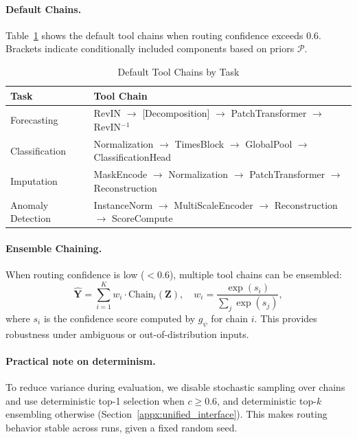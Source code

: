 \paragraph{Default Chains.}
Table~\ref{tab:default_chains} shows the default tool chains when routing confidence exceeds 0.6. Brackets indicate conditionally included components based on priors $\mathcal{P}$.

\begin{table}[h]
\centering
\caption{Default Tool Chains by Task}
\label{tab:default_chains}
\begin{tabular}{ll}
\toprule
\textbf{Task} & \textbf{Tool Chain} \\
\midrule
Forecasting & RevIN $\rightarrow$ [Decomposition] $\rightarrow$ PatchTransformer $\rightarrow$ RevIN$^{-1}$ \\
Classification & Normalization $\rightarrow$ TimesBlock $\rightarrow$ GlobalPool $\rightarrow$ ClassificationHead \\
Imputation & MaskEncode $\rightarrow$ Normalization $\rightarrow$ PatchTransformer $\rightarrow$ Reconstruction \\
Anomaly Detection & InstanceNorm $\rightarrow$ MultiScaleEncoder $\rightarrow$ Reconstruction $\rightarrow$ ScoreCompute \\
\bottomrule
\end{tabular}
\end{table}

\paragraph{Ensemble Chaining.}
When routing confidence is low ($< 0.6$), multiple tool chains can be ensembled:
\begin{equation}
\hat{\mathbf{Y}} = \sum_{i=1}^{K} w_i \cdot \text{Chain}_i(\mathbf{Z}), \quad w_i = \frac{\exp(s_i)}{\sum_j \exp(s_j)},
\end{equation}
where $s_i$ is the confidence score computed by $g_{\psi}$ for chain $i$. This provides robustness under ambiguous or out-of-distribution inputs.

\paragraph{Practical note on determinism.}
To reduce variance during evaluation, we disable stochastic sampling over chains and use deterministic top-1 selection when $c \ge 0.6$, and deterministic top-$k$ ensembling otherwise (Section~\ref{appx:unified_interface}).
This makes routing behavior stable across runs, given a fixed random seed.


\newpage
